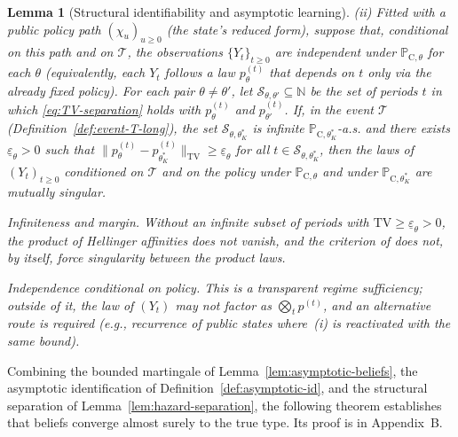 \documentclass[pdflatex,sn-mathphys-ay]{sn-jnl}
\theoremstyle{plain}
\newtheorem{lemma}[theorem]{Lemma}
\theoremstyle{definition}
\newcommand{\ProbC}[1]{\mathbb{P}_{\mathrm{C},#1}}
\newcommand{\1}{\mathbf{1}}
\begin{document}
\begin{lemma}[Structural identifiability and asymptotic learning]
\medskip
\noindent\textup{(ii)}
Fitted with a public policy path $(\chi_u)_{u\ge 0}$ \textup{(}the state's reduced form\textup{)}, suppose that, conditional on this path and on $\mathcal{T}$, the observations $\{Y_t\}_{t\ge 0}$ are independent under $\ProbC{\theta}$ for each $\theta$ \textup{(}equivalently, each $Y_t$ follows a law $p_\theta^{(t)}$ that depends on $t$ only via the already fixed policy\textup{)}. For each pair $\theta\neq\theta'$, let $\mathcal{S}_{\theta,\theta'}\subseteq\mathbb{N}$ be the set of periods $t$ in which \eqref{eq:TV-separation} holds with $p_\theta^{(t)}$ and $p_{\theta'}^{(t)}$. If, in the event $\mathcal{T}$ \textup{(}Definition~\ref{def:event-T-long}\textup{)}, the set $\mathcal{S}_{\theta,\theta_K^\ast}$ is infinite $\ProbC{\theta_K^\ast}$-a.s. and there exists $\underline{\varepsilon}_{\theta}>0$ such that $\|p_\theta^{(t)}-p_{\theta_K^\ast}^{(t)}\|_{\mathrm{TV}}\ge \underline{\varepsilon}_{\theta}$ for all $t\in\mathcal{S}_{\theta,\theta_K^\ast}$, then the laws of $(Y_t)_{t\ge 0}$ conditioned on $\mathcal{T}$ and on the policy under $\ProbC{\theta}$ and under $\ProbC{\theta_K^\ast}$ are mutually singular.

\medskip
\begin{list}{}{%
  \setlength{\leftmargin}{2.25em}%
  \setlength{\labelwidth}{2.25em}%
  \setlength{\labelsep}{0.45em}%
  \setlength{\itemsep}{0.35em}%
  \setlength{\parsep}{0pt}%
  \setlength{\topsep}{0.25em}%
}
\item[\textup{(C3)}] \textup{Infiniteness and margin.}\quad
Without an infinite subset of periods with $\mathrm{TV}\ge\underline{\varepsilon}_\theta>0$, the product of Hellinger affinities does not vanish, and the criterion of \citet{Kakutani1948} does not, by itself, force singularity between the product laws.
\item[\textup{(C4)}] \textup{Independence conditional on policy.}\quad
This is a transparent regime sufficiency; outside of it, the law of $(Y_t)$ may not factor as $\bigotimes_t p^{(t)}$, and an alternative route is required \textup{(}e.g., recurrence of public states where~\textup{(i)} is reactivated with the same bound\textup{)}.
\end{list}
\end{lemma}

Combining the bounded martingale of Lemma~\ref{lem:asymptotic-beliefs}, the asymptotic identification of Definition~\ref{def:asymptotic-id}, and the structural separation of Lemma~\ref{lem:hazard-separation}, the following theorem establishes that beliefs converge almost surely to the true type. Its proof is in Appendix~B.
\end{document}
